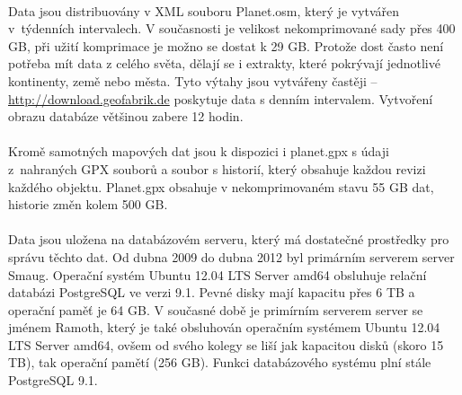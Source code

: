 \documentclass[11pt,a4paper,titlepage,oneside]{book}
\begin{document}

		\paragraph{} Data jsou distribuovány v XML souboru Planet.osm, který je vytvářen v~týdenních intervalech. V současnosti je velikost nekomprimované sady přes 400 GB, při užití komprimace je možno se dostat k 29 GB. Protože dost často není potřeba mít data z celého světa, dělají se i extrakty, které pokrývají jednotlivé kontinenty, země nebo města. Tyto výtahy jsou vytvářeny častěji -- \url{http://download.geofabrik.de} poskytuje data s denním intervalem. Vytvoření obrazu databáze většinou zabere 12 hodin\cite{planet.osm}.


	\paragraph{} Kromě samotných mapových dat jsou k dispozici i planet.gpx s údaji z~nahraných GPX souborů a soubor s historií, který obsahuje každou revizi každého objektu. Planet.gpx obsahuje v nekomprimovaném stavu 55 GB dat, historie změn kolem 500 GB. 


	\paragraph{} Data jsou uložena na databázovém serveru, který má dostatečné prostředky pro správu těchto dat. Od dubna 2009 do dubna 2012 byl primárním serverem server Smaug. Operační systém Ubuntu 12.04 LTS Server amd64 obsluhuje relační databázi PostgreSQL ve verzi 9.1. Pevné disky mají kapacitu přes 6 TB a operační paměť je 64 GB. V současné době je primírním serverem server se jménem Ramoth, který je také obsluhován operačním systémem Ubuntu 12.04 LTS Server amd64, ovšem od svého kolegy se liší jak kapacitou disků (skoro 15 TB), tak operační pamětí (256 GB). Funkci databázového systému plní stále PostgreSQL 9.1.

\end{document}
